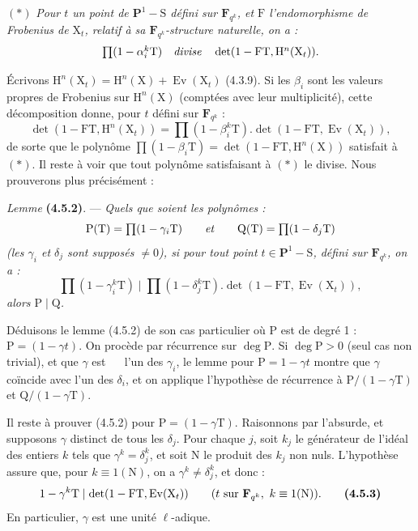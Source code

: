 \documentclass[11pt,leqno]{article}
\newcommand{\Page}[1]{\ifvmode\noindent\else\unskip\ \fi{\footnotesize\textcolor{gray}{[p.\,#1]}}\ \ignorespaces}
\begin{document}
\((*)\) \textit{Pour \(t\) un point de \(\mathbf{P}^1-\mathrm{S}\) défini sur \(\mathbf{F}_{q^k}\), et \(\mathrm{F}\) l’endomorphisme de Frobenius de \(\mathrm{X}_t\), relatif à sa \(\mathbf{F}_{q^k}\)-structure naturelle, on a :}
\[
\textstyle
\prod(1-\alpha_i^k\mathrm{T})
\quad\text{\textit{divise}}\quad
\det(1-\mathrm{F}\mathrm{T},\mathrm{H}^n(\mathrm{X}_t)).
\]

Écrivons \(\mathrm{H}^n(\mathrm{X}_t)=\mathrm{H}^n(\mathrm{X})+\operatorname{Ev}(\mathrm{X}_t)\) (4.3.9). Si les \(\beta_i\) sont les valeurs propres de Frobenius sur \(\mathrm{H}^n(\mathrm{X})\) (comptées avec leur multiplicité), cette décomposition donne, pour \(t\) défini sur \(\mathbf{F}_{q^k}\) :
\[
\textstyle
\det(1-\mathrm{F}\mathrm{T},\mathrm{H}^n(\mathrm{X}_t))
=\prod(1-\beta_i^k\mathrm{T}).\det(1-\mathrm{F}\mathrm{T},\operatorname{Ev}(\mathrm{X}_t)),
\]
de sorte que le polynôme \(\prod(1-\beta_i\mathrm{T})=\det(1-\mathrm{F}\mathrm{T},\mathrm{H}^n(\mathrm{X}))\) satisfait à \((*)\). Il reste à voir que tout polynôme satisfaisant à \((*)\) le divise. Nous prouverons plus précisément :

\textit{Lemme} \textbf{(4.5.2)}. — \textit{Quels que soient les polynômes :}
\[
\textstyle
\mathrm{P}(\mathrm{T})=\prod(1-\gamma_i\mathrm{T})
\qquad\text{\textit{et}}\qquad
\mathrm{Q}(\mathrm{T})=\prod(1-\delta_j\mathrm{T})
\]
\textit{(les \(\gamma_i\) et \(\delta_j\) sont supposés \(\neq0\)), si pour tout point \(t\in\mathbf{P}^1-\mathrm{S}\), défini sur \(\mathbf{F}_{q^k}\), on a :}
\[
\textstyle
\prod(1-\gamma_i^k\mathrm{T})
\mid
\prod(1-\delta_j^k\mathrm{T}).\det(1-\mathrm{F}\mathrm{T},\operatorname{Ev}(\mathrm{X}_t)),
\]
\textit{alors \(\mathrm{P}\mid\mathrm{Q}\).}

Déduisons le lemme (4.5.2) de son cas particulier où \(\mathrm{P}\) est de degré 1 : \(\mathrm{P}=(1-\gamma t)\). On procède par récurrence sur \(\deg\mathrm{P}\). Si \(\deg\mathrm{P}>0\) (seul cas non trivial), et que \(\gamma\) est
\Page{232}
l’un des \(\gamma_i\), le lemme pour \(\mathrm{P}=1-\gamma t\) montre que \(\gamma\) coïncide avec l’un des \(\delta_i\), et on applique l’hypothèse de récurrence à \(\mathrm{P}/(1-\gamma\mathrm{T})\) et \(\mathrm{Q}/(1-\gamma\mathrm{T})\).

Il reste à prouver (4.5.2) pour \(\mathrm{P}=(1-\gamma\mathrm{T})\). Raisonnons par l’absurde, et supposons \(\gamma\) distinct de tous les \(\delta_j\). Pour chaque \(j\), soit \(k_j\) le générateur de l’idéal des entiers \(k\) tels que \(\gamma^k=\delta_j^k\), et soit \(\mathrm{N}\) le produit des \(k_j\) non nuls. L’hypothèse assure que, pour \(k\equiv1(\mathrm{N})\), on a \(\gamma^k\neq\delta_j^k\), et donc :
\[
1-\gamma^k\mathrm{T}
\mid\det(1-\mathrm{F}\mathrm{T},\operatorname{Ev}(\mathrm{X}_t))
\qquad
(t\text{ sur }\mathbf{F}_{q^k},\ k\equiv1(\mathrm{N})).
\tag*{\textbf{(4.5.3)}}
\]
En particulier, \(\gamma\) est une unité \(\ell\)-adique.
\end{document}
